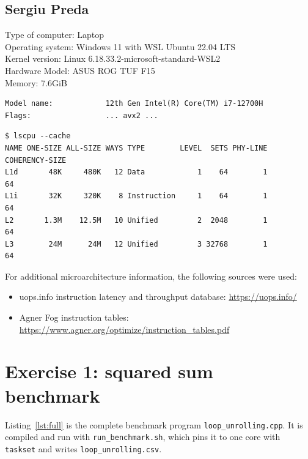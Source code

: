 \documentclass[a4paper,11pt]{article}
\begin{document}
\subsection{Sergiu Preda}

Type of computer: Laptop \\
Operating system: Windows 11 with WSL Ubuntu 22.04 LTS \\
Kernel version: Linux 6.18.33.2-microsoft-standard-WSL2 \\
Hardware Model: ASUS ROG TUF F15 \\
Memory: 7.6GiB

\begin{lstlisting}[caption=From lscpu]
Model name:            12th Gen Intel(R) Core(TM) i7-12700H
Flags:                 ... avx2 ...
\end{lstlisting}

\begin{lstlisting}[caption=From lscpu --cache]
$ lscpu --cache
NAME ONE-SIZE ALL-SIZE WAYS TYPE        LEVEL  SETS PHY-LINE COHERENCY-SIZE
L1d       48K     480K   12 Data            1    64        1             64
L1i       32K     320K    8 Instruction     1    64        1             64
L2       1.3M    12.5M   10 Unified         2  2048        1             64
L3        24M      24M   12 Unified         3 32768        1             64
\end{lstlisting}

For additional microarchitecture information, the following sources
were used:

\begin{itemize}
    \item uops.info instruction latency and throughput database: \url{https://uops.info/}
    \item Agner Fog instruction tables: \url{https://www.agner.org/optimize/instruction_tables.pdf}
\end{itemize}


\newpage
\appendix

\section{Exercise 1: squared sum benchmark}
\label{app:code}

Listing~\ref{lst:full} is the complete benchmark program
\texttt{loop\_unrolling.cpp}. It is compiled and run with
\texttt{run\_benchmark.sh}, which pins it to one core with \texttt{taskset}
and writes \texttt{loop\_unrolling.csv}.
\end{document}

